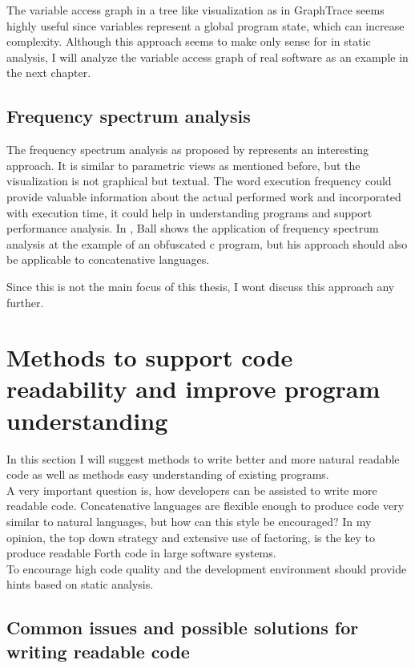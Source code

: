 The variable access graph in a tree like visualization as in GraphTrace seems highly useful since variables represent a global program state, which can increase complexity. Although this approach seems to make only sense for in static analysis, I will analyze the variable access graph of real software as an example in the next chapter.

\subsection*{Frequency spectrum analysis}

The frequency spectrum analysis as proposed by \cite{Ball:1999:CDA:318774.318944} represents an interesting approach. It is similar to parametric views as mentioned before, but the visualization is not graphical but textual. The word execution frequency could provide valuable information about the actual performed work and incorporated with execution time, it could help in understanding programs and support performance analysis. In \cite{Ball:1999:CDA:318774.318944}, Ball shows the application of frequency spectrum analysis at the example of an obfuscated c program, but his approach should also be applicable to concatenative languages.

Since this is not the main focus of this thesis, I wont discuss this approach any further.

\section{Methods to support code readability and improve program understanding}

In this section I will suggest methods to write better and more natural readable code as well as methods easy understanding of existing programs.
\\
A very important question is, how developers can be assisted to write more readable code. Concatenative languages are flexible enough to produce code very similar to natural languages, but how can this style be encouraged? In my opinion, the top down strategy and extensive use of factoring, is the key to produce readable Forth code in large software systems.
\\
To encourage high code quality and the development environment should provide hints based on static analysis.

\subsection{Common issues and possible solutions for writing readable code}

